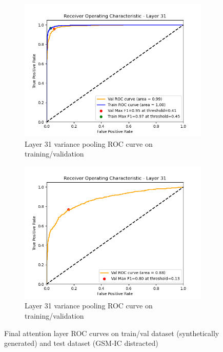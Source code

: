 \documentclass{article}
\begin{document}
\begin{figure}[h!]
    \centering
    \begin{subfigure}[b]{0.48\linewidth}
        \centering
        \includegraphics[width=\linewidth]{tex/finalreport230/variance_roc_curve_layer_31_training.png}
        \caption{Layer 31 variance pooling ROC curve on training/validation}
        \label{fig:train_roc_curve}
    \end{subfigure}
    \hfill
    \begin{subfigure}[b]{0.48\linewidth}
        \centering
        \includegraphics[width=\linewidth]{tex/finalreport230/variance_roc_curve_layer_31_test.png}
        \caption{Layer 31 variance pooling ROC curve on training/validation}
        \label{fig:test_roc_curve}
    \end{subfigure}
    \caption{Final attention layer ROC curves on train/val dataset (synthetically generated) and test dataset (GSM-IC distracted)}
    \label{fig:roc_curves}
\end{figure}
\end{document}

